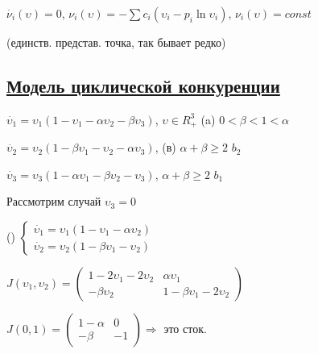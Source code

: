 \vspace{0.5cm}
\(\dot{\nu_i}(\upsilon) = 0\), \hspace{10pt}\({\nu_i}(\upsilon) = -\sum c_i(\upsilon_i - p_i\ln \upsilon_i)\), \hspace{10pt} \({\nu_i}(\upsilon) = const\)

(единств. представ. точка, так бывает редко)

\vspace{0.5cm}
\subsection*{{\Large \underline{Модель циклической конкуренции}}}

\vspace{0.5cm}
\(\dot{\upsilon_1} = \upsilon_1(1-\upsilon_1 - \alpha\upsilon_2 - \beta\upsilon_3) \), \hspace{3cm}\( \upsilon \in R_+^3\) \hspace{2cm} (a) \(0 < \beta < 1 < \alpha\)

\(\dot{\upsilon_2} = \upsilon_2(1-\beta\upsilon_1 - \upsilon_2 - \alpha\upsilon_3) \), \hspace{6.3cm} (в) \(\alpha+\beta\geq 2\) \(b_2\)

\(\dot{\upsilon_3} = \upsilon_3(1-\alpha\upsilon_1 - \beta\upsilon_2 - \upsilon_3) \),
\hspace{6.6cm} \(\alpha+\beta\geq 2\) \(b_1\)


\vspace{0.5cm}
Рассмотрим случай { \underline{\(\upsilon_3 = 0\)}}

\vspace{0.5cm}
({})
\(
 \begin{cases}
    \dot{\upsilon_1} = \upsilon_1(1-\upsilon_1 - \alpha\upsilon_2 ) 
    \\
    \dot{\upsilon_2} = \upsilon_2(1-\beta\upsilon_1 - \upsilon_2 ) 
 \end{cases}
\)

\vspace{0.5cm}
\(
J(\upsilon_1,\upsilon_2) = 
 \begin{pmatrix}
 1-2\upsilon_1-2\upsilon_2 & \alpha\upsilon_1\\
 -\beta\upsilon_2 & 1-\beta\upsilon_1 - 2\upsilon_2
 \end{pmatrix}
\)

\vspace{0.5cm}

\(
 J(0,1) = 
 \begin{pmatrix}
 1-\alpha & 0 \\ 
 -\beta & -1
 \end{pmatrix}
\)\hspace{0.5cm}\(\Rightarrow\) это сток.

